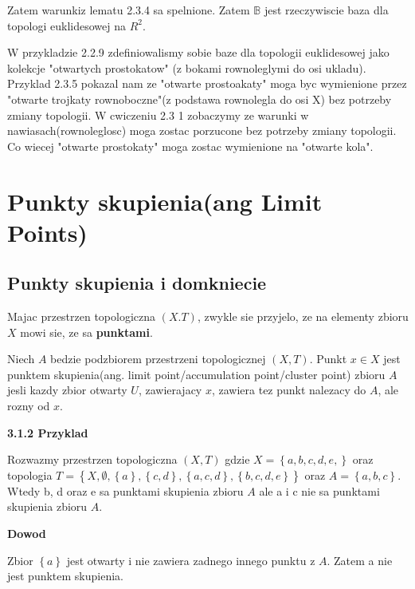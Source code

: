 \documentclass{article}
\begin{document}
Zatem warunkiz lematu 2.3.4 sa spelnione. Zatem $\mathbb{B}$ jest rzeczywiscie baza dla topologi euklidesowej na $R^{2}$.

\vspace{1cm}

W przykladzie 2.2.9 zdefiniowalismy sobie baze dla topologii euklidesowej jako kolekcje "otwartych prostokatow" (z bokami rownoleglymi do osi ukladu). Przyklad 2.3.5 pokazal nam ze "otwarte prostoakaty" moga byc wymienione przez "otwarte trojkaty rownoboczne"(z podstawa rownolegla do osi X) bez potrzeby zmiany topologii. W cwiczeniu 2.3 1 zobaczymy ze warunki w nawiasach(rownoleglosc) moga zostac porzucone bez potrzeby zmiany topologii. Co wiecej "otwarte prostokaty" moga zostac wymienione na "otwarte kola".
\section{Punkty skupienia(ang Limit Points)}

\subsection{Punkty skupienia i domkniecie}

Majac przestrzen topologiczna $(X.T)$, zwykle sie przyjelo, ze na elementy zbioru $X$ mowi sie, ze sa \textbf{punktami}.

\begin{tcolorbox}[colback=white!90!red,colframe=black!35!red,title=3.1.1 Definicja: Punkt skupienia(limit point/accumulation point/clusterpoint)]

    Niech $A$ bedzie podzbiorem przestrzeni topologicznej $(X,T)$. Punkt  $x\in X$ jest punktem skupienia(ang. limit point/accumulation point/cluster point) zbioru $A$ jesli kazdy zbior otwarty $U$, zawierajacy $x$, zawiera tez punkt nalezacy do $A$, ale rozny od $x$.

\end{tcolorbox}

\textbf{3.1.2 Przyklad}

Rozwazmy przestrzen topologiczna $(X,T)$ gdzie $X = \left\{ a,b,c,d,e, \right\}$ oraz topologia $T = \left\{X, \emptyset, \left\{ a \right\}, \left\{ c, d \right\}, \left\{ a,c,d \right\}, \left\{ b,c,d,e \right\}  \right\}$ oraz $A = \left\{ a,b,c \right\}$. Wtedy b, d oraz e sa punktami skupienia zbioru $A$ ale a i c nie sa punktami skupienia zbioru $A$.

\textbf{Dowod}

Zbior $\left\{ a \right\}$ jest otwarty i nie zawiera zadnego innego punktu z $A$. Zatem a nie jest punktem skupienia.
\end{document}
